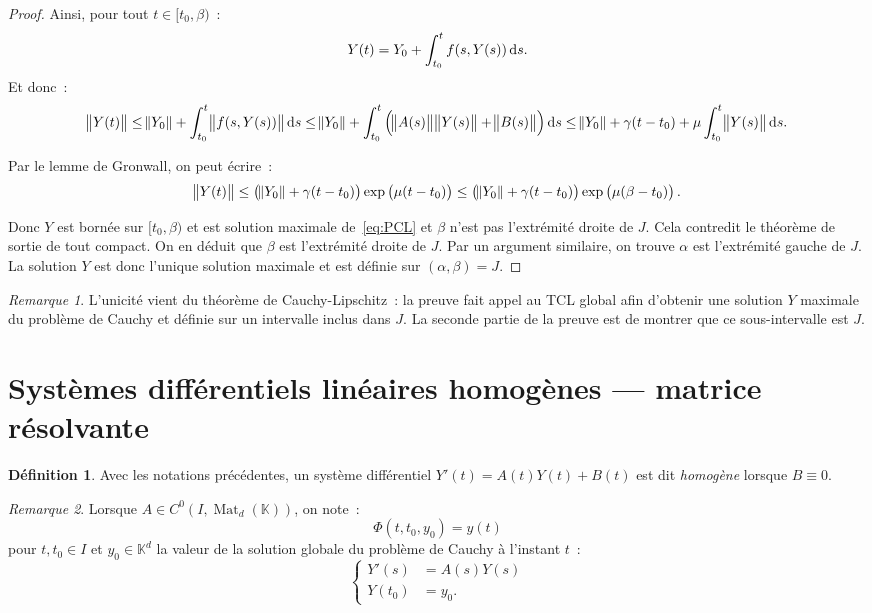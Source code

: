 \documentclass{report}
\theoremstyle{definition}
\newtheorem{déf}[thm]{Définition}
\theoremstyle{remark}
\newtheorem*{rmq}{Remarque}
\numberwithin{equation}{section}
\newcommand{\K}{\mathbb K}
\DeclareMathOperator{\Mat}{Mat}
\begin{document}
\begin{proof}
			Ainsi, pour tout $t \in [t_0, \beta)$~:
			\begin{equation}
				Y(t) = Y_0 + \int_{t_0}^tf(s, Y(s))\dif s.
			\end{equation}
			Et donc~:
			\begin{equation}
				\norm {Y(t)} \leq \norm {Y_0} + \int_{t_0}^t\norm {f(s, Y(s))}\dif s \leq \norm {Y_0} + \int_{t_0}^t\left(\norm {A(s)}\norm {Y(s)} + \norm {B(s)}\right)\dif s
				\leq \norm {Y_0} + \gamma(t-t_0) + \mu\int_{t_0}^t\norm {Y(s)}\dif s.
			\end{equation}

			Par le lemme de Gronwall, on peut écrire~:
			\begin{equation}
				\norm {Y(t)} \leq \left(\norm {Y_0} + \gamma(t-t_0)\right)\exp\left(\mu(t-t_0)\right)
				\leq \left(\norm {Y_0} + \gamma(t-t_0)\right)\exp\left(\mu(\beta-t_0)\right).
			\end{equation}

			Donc $Y$ est bornée sur $[t_0, \beta)$ et est solution maximale de~\eqref{eq:PCL} et $\beta$ n'est pas l'extrémité droite de $J$. Cela contredit le
			théorème de sortie de tout compact. On en déduit que $\beta$ est l'extrémité droite de $J$. Par un argument similaire, on trouve $\alpha$ est
			l'extrémité gauche de $J$. La solution $Y$ est donc l'unique solution maximale et est définie sur $(\alpha, \beta) = J$.
			\end{proof}

			\begin{rmq} L'unicité vient du théorème de Cauchy-Lipschitz~: la preuve fait appel au TCL global afin d'obtenir une solution $Y$ maximale du problème
			de Cauchy et définie sur un intervalle inclus dans $J$. La seconde partie de la preuve est de montrer que ce sous-intervalle est $J$.
			\end{rmq}

	\section{Systèmes différentiels linéaires homogènes --- matrice résolvante}
		\begin{déf} Avec les notations précédentes, un système différentiel $Y'(t) = A(t)Y(t) + B(t)$ est dit \textit{homogène} lorsque $B \equiv 0$.
		\end{déf}

		\begin{rmq} Lorsque $A \in C^0(I, \Mat_d(\K))$, on note~:
		\begin{equation}
			\Phi(t, t_0, y_0) = y(t)
		\end{equation}
		pour $t, t_0 \in I$ et $y_0 \in \K^d$ la valeur de la solution globale du problème de Cauchy à l'instant $t$~:
		\begin{equation}
			\begin{cases}
			Y'(s) &= A(s)Y(s) \\
			Y(t_0) &= y_0.
		\end{cases}
		\end{equation}
		\end{rmq}
\end{document}
